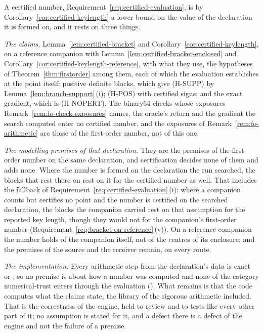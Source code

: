 \begin{remark}\label{rem:certified-scope}
A certified number, Requirement~\ref{req:certified-evaluation}, is by
Corollary~\ref{cor:certified-keylength} a lower bound on the value of the
declaration it is formed on, and it rests on three things.

\emph{The claims.} Lemma~\ref{lem:certified-bracket} and
Corollary~\ref{cor:certified-keylength}, on a reference companion with
Lemma~\ref{lem:certified-bracket-enclosed} and
Corollary~\ref{cor:certified-keylength-reference}, with what they use, the hypotheses of
Theorem~\ref{thm:firstorder} among them, each of which the evaluation
establishes at the point itself: positive definite blocks, which give
(H-SUPP) by Lemma~\ref{lem:branch-support}\,(i); (H-POS) with certified
signs; and the exact gradient, which is (H-NOPERT). The binary64 checks whose
exposures Remark~\ref{rem:fo-check-exposures} names, the oracle's return and
the gradient the search computed enter no certified number, and the
exposures of Remark~\ref{rem:fo-arithmetic} are those of the first-order
number, not of this one.

\emph{The modelling premises of that declaration.} They are the premises of
the first-order number on the same declaration, and certification decides
none of them and adds none. Where the number is formed on the declaration
the run searched, the blocks that rest there on
 rest on it for the certified number
as well. That includes the fallback of
Requirement~\ref{req:certified-evaluation}\,(i): where a companion counts but
certifies no point and the number is certified on the searched declaration,
the blocks the companion carried rest on that assumption for the reported
key length, though they would not for the companion's first-order number
(Requirement~\ref{req:bracket-on-reference}\,(v)). On a reference companion
the number holds of the companion itself, not of the centres of its
enclosure; and the premises of the source and the receiver remain, on every
route.

\emph{The implementation.} Every arithmetic step from the declaration's data
is exact or , so no premise is about how a number
was computed and none of the category numerical-trust enters through the
evaluation (). What remains is that the code
computes what the claims state, the library of the rigorous arithmetic
included. That is the correctness of the engine, held to review and to tests
like every other part of it; no assumption is stated for it, and a defect
there is a defect of the engine and not the failure of a premise.


\end{remark}
